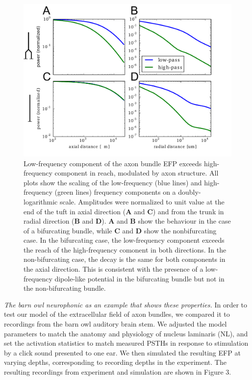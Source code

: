\documentclass[]{article}
\begin{document}
\begin{figure}[htbp]
\centering
\includegraphics{../figs/fig_2.pdf}
\caption{Low-frequency component of the axon bundle EFP exceeds
high-frequency component in reach, modulated by axon structure. All
plots show the scaling of the low-frequency (blue lines) and
high-frequency (green lines) frequency components on a
doubly-logarithmic scale. Amplitudes were normalized to unit value at
the end of the tuft in axial direction (\textbf{A} and \textbf{C}) and
from the trunk in radial direction (\textbf{B} and \textbf{D}).
\textbf{A} and \textbf{B} show the behaviour in the case of a
bifurcating bundle, while \textbf{C} and \textbf{D} show the
nonbifurcating case. In the bifurcating case, the low-frequency
component exceeds the reach of the high-frequency comonent in both
directions. In the non-bifurcating case, the decay is the same for both
components in the axial direction. This is consistent with the presence
of a low-frequency dipole-like potential in the bifurcating bundle but
not in the non-bifurcating bundle.}
\end{figure}

\emph{The barn owl neurophonic as an example that shows these
properties.} In order to test our model of the extracellular field of
axon bundles, we compared it to recordings from the barn owl auditory
brain stem. We adjusted the model parameters to match the anatomy and
physiology of nucleus laminaris (NL), and set the activation statistics
to match measured PSTHs in response to stimulation by a click sound
presented to one ear. We then simulated the resulting EFP at varying
depths, corresponding to recording depths in the experiment. The
resulting recordings from experiment and simulation are shown in Figure
3.
\end{document}
